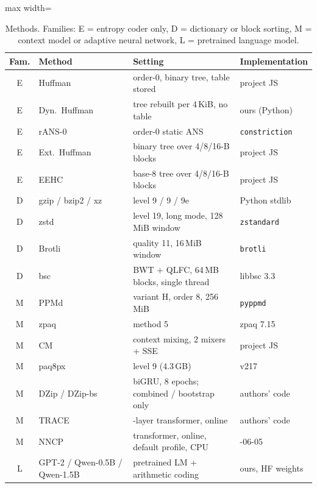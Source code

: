 \begin{table}[t]\centering\caption{Methods. Families: E = entropy coder only, D = dictionary or block sorting, M = context model or adaptive neural network, L = pretrained language model.}\label{tab:methods}\footnotesize\setlength{\tabcolsep}{3pt}
\begin{adjustbox}{max width=\columnwidth}\begin{tabular}{@{}c>{\raggedright\arraybackslash}p{1.55cm}>{\raggedright\arraybackslash}p{3.65cm}>{\raggedright\arraybackslash}p{2.05cm}@{}}\toprule
Fam. & Method & Setting & Implementation\\\midrule
E & Huffman & order-0, binary tree, table stored & project JS\\
E & Dyn.\ Huffman & tree rebuilt per 4\,KiB, no table~\cite{klein2024dynhuff} & ours (Python)\\
E & rANS-0 & order-0 static ANS~\cite{duda2013ans} & \texttt{constriction}\\
E & Ext.\ Huffman & binary tree over 4/8/16-B blocks & project JS\\
E & EEHC & base-8 tree over 4/8/16-B blocks~\cite{yeful2026eehc} & project JS\\
D & gzip / bzip2 / xz & level 9 / 9 / 9e & Python stdlib\\
D & zstd & level 19, long mode, 128\,MiB window & \texttt{zstandard}\\
D & Brotli & quality 11, 16\,MiB window & \texttt{brotli}\\
D & bsc & BWT + QLFC, 64\,MB blocks, single thread & libbsc 3.3\\
M & PPMd & variant H, order 8, 256\,MiB & \texttt{pyppmd}\\
M & zpaq & method 5 & zpaq 7.15\\
M & CM & context mixing, 2 mixers + SSE & project JS\\
M & paq8px & level 9 (4.3\,GB) & v217\\
M & DZip / DZip-bs & biGRU, 8 epochs; combined / bootstrap only & authors' code\\
M & TRACE & 1-layer transformer, online & authors' code\\
M & NNCP & transformer, online, default profile, CPU & 2024-06-05\\
L & GPT-2 / Qwen-0.5B / Qwen-1.5B & pretrained LM + arithmetic coding & ours, HF weights\\
\bottomrule\end{tabular}\end{adjustbox}\end{table}